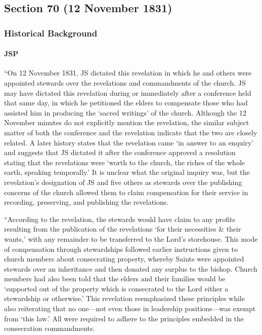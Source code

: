 \subsection{Section 70 (12 November 1831)}
	\label{DC70}
	
	\subsubsection{Historical Background}
		\label{DC70-HB}
		
		\paragraph{JSP}
		
			``On 12 November 1831, JS dictated this revelation in which he and others were appointed stewards over the revelations and commandments of the church. JS may have dictated this revelation during or immediately after a conference held that same day, in which he petitioned the elders to compensate those who had assisted him in producing the `sacred writings' of the church. Although the 12 November minutes do not explicitly mention the revelation, the similar subject matter of both the conference and the revelation indicate that the two are closely related. A later history states that the revelation came `in answer to an enquiry' and suggests that JS dictated it after the conference approved a resolution stating that the revelations were `worth to the church, the riches of the whole earth, speaking temporally.' It is unclear what the original inquiry was, but the revelation's designation of JS and five others as stewards over the publishing concerns of the church allowed them to claim compensation for their service in recording, preserving, and publishing the revelations.
				
			``According to the revelation, the stewards would have claim to any profits resulting from the publication of the revelations `for their necessities \& their wants,' with any remainder to be transferred to the Lord's storehouse. This mode of compensation through stewardships followed earlier instructions given to church members about consecrating property, whereby Saints were appointed stewards over an inheritance and then donated any surplus to the bishop. Church members had also been told that the elders and their families would be `supported out of the property which is consecrated to the Lord either a stewardship or otherwise.' This revelation reemphasized these principles while also reiterating that no one---not even those in leadership positions---was exempt from `this law.' All were required to adhere to the principles embedded in the consecration commandments.
			

